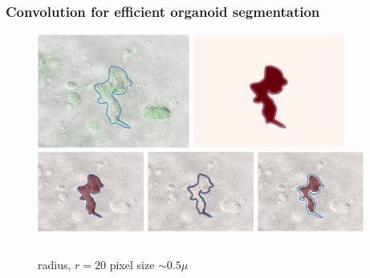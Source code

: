 \documentclass{beamer} %
\begin{document}
\begin{frame}
	\frametitle{Convolution for efficient organoid segmentation}
	\begin{figure}
		\centering
		\includegraphics[width=5cm]{Border}
		\includegraphics[width=5cm]{convolved_array}
		\includegraphics[width=3.5cm]{internal_map}
		\includegraphics[width=3.5cm]{inner_border}
		\includegraphics[width=3.5cm]{internal_area}
		\begin{columns}
			radius, $r= 20$ pixel size $\sim 0.5 \mu$ 
		\end{columns}
	\end{figure}
\end{frame}
\end{document}
